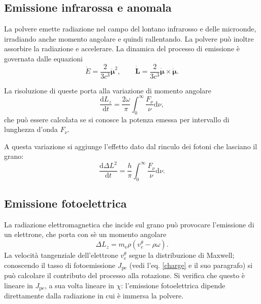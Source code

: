 \subsection{Emissione infrarossa e anomala}

La polvere emette radiazione nel campo del lontano infrarosso e delle microonde, irradiando anche momento angolare e quindi rallentando. La polvere può inoltre assorbire la radiazione e accelerare.
La dinamica del processo di emissione è governata dalle equazioni
\begin{equation}
\dot{E} = \frac{2}{3c^3} \boldsymbol{\ddot{\mu}}^2, \qquad
\boldsymbol{\dot{L}} = \frac{2}{3c^3} \boldsymbol{\dot{\mu}} \times \boldsymbol{\ddot{\mu}}.
\end{equation}

La risoluzione di queste porta alla variazione di momento angolare 
\begin{equation}
\label{smemissione}
\frac{\mathrm{d}L_z}{\mathrm{d}t} = \frac{2\omega}{\pi} \int_{0}^{\infty} \!\frac{F_\nu}{\nu} \mathrm{d}\nu,
\end{equation}
che può essere calcolata se si conosce la potenza emessa per intervallo di lunghezza d'onda $F_\nu$.

A questa variazione si aggiunge l'effetto dato dal rinculo dei fotoni che lasciano il grano:
\begin{equation}
\frac{\mathrm{d}\Delta L^2}{\mathrm{d}t} = \frac{h}{\pi} \int_{0}^{\infty} \!\frac{F_\nu}{\nu} \mathrm{d}\nu.
\end{equation}

\subsection{Emissione fotoelettrica}

La radiazione elettromagnetica che incide sul grano può provocare l'emissione di un elettrone, che porta con sè un momento angolare
\begin{equation}
\Delta L_z = m_{\mathrm{e}} \rho ( v^\theta_e - \rho\omega).
\end{equation}
La velocità tangenziale dell'elettrone $v^\theta_e$ segue la distribuzione di Maxwell; conoscendo il tasso di fotoemissione $J_{\mathrm{pe}}$ (vedi l'eq. \ref{charge} e il suo paragrafo) si può calcolare il contributo del processo alla rotazione. Si verifica che questo è lineare in $J_{\mathrm{pe}}$, a sua volta lineare in $\chi$: l'emissione fotoelettrica dipende direttamente dalla radiazione in cui è immersa la polvere.

